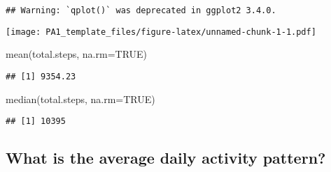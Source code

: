 \documentclass[
]{article}
\newenvironment{Shaded}{\begin{snugshade}}{\end{snugshade}}
\newcommand{\AttributeTok}[1]{\textcolor[rgb]{0.77,0.63,0.00}{#1}}
\newcommand{\ConstantTok}[1]{\textcolor[rgb]{0.00,0.00,0.00}{#1}}
\newcommand{\DecValTok}[1]{\textcolor[rgb]{0.00,0.00,0.81}{#1}}
\newcommand{\FunctionTok}[1]{\textcolor[rgb]{0.00,0.00,0.00}{#1}}
\newcommand{\NormalTok}[1]{#1}
\newcommand{\OtherTok}[1]{\textcolor[rgb]{0.56,0.35,0.01}{#1}}
\newcommand{\SpecialCharTok}[1]{\textcolor[rgb]{0.00,0.00,0.00}{#1}}
\newcommand{\StringTok}[1]{\textcolor[rgb]{0.31,0.60,0.02}{#1}}
\begin{document}
\begin{Shaded}
\end{Shaded}
\begin{verbatim}
## Warning: `qplot()` was deprecated in ggplot2 3.4.0.
\end{verbatim}
\texttt{[image: PA1\_template\_files/figure-latex/unnamed-chunk-1-1.pdf]}
\begin{Shaded}
\begin{Highlighting}[]
\FunctionTok{mean}\NormalTok{(total.steps, }\AttributeTok{na.rm=}\ConstantTok{TRUE}\NormalTok{)}
\end{Highlighting}
\end{Shaded}
\begin{verbatim}
## [1] 9354.23
\end{verbatim}
\begin{Shaded}
\begin{Highlighting}[]
\FunctionTok{median}\NormalTok{(total.steps, }\AttributeTok{na.rm=}\ConstantTok{TRUE}\NormalTok{)}
\end{Highlighting}
\end{Shaded}
\begin{verbatim}
## [1] 10395
\end{verbatim}
\hypertarget{what-is-the-average-daily-activity-pattern}{%
\subsection{What is the average daily activity
pattern?}\label{what-is-the-average-daily-activity-pattern}}
\begin{Shaded}
\end{Shaded}
\end{document}
